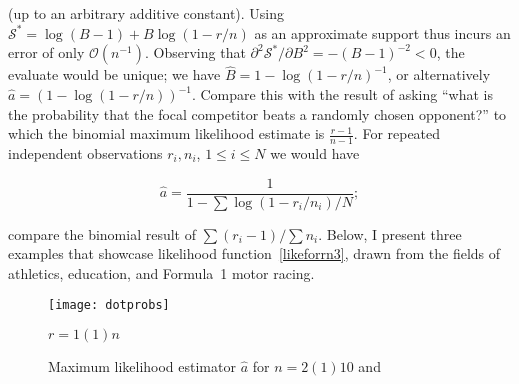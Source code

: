 \documentclass[article]{ajs}
\begin{document}
(up to an arbitrary additive constant).  Using
$\mathcal{S}^*=\log(B-1)+B\log(1-r/n)$ as an approximate support thus
incurs an error of only $\mathcal{O}(n^{-1})$.  Observing that
$\partial^2\mathcal{S}^*/\partial B^2=-(B-1)^{-2}<0$, the evaluate
would be unique; we have $\hat{B}=1-\log(1-r/n)^{-1}$, or
alternatively $\hat{a}=(1-\log(1-r/n))^{-1}$.  Compare this with the
result of asking ``what is the probability that the focal competitor
beats a randomly chosen opponent?'' to which the binomial maximum
likelihood estimate is $\frac{r-1}{n-1}$.  For repeated independent
observations $r_i,n_i$, $1\leqslant i\leqslant N$ we would have

\begin{equation}
  \hat{a} =   \frac{1}{1-\sum\log(1-r_i/n_i)/N};
\end{equation}

compare the binomial result of $\sum(r_i-1)/\sum n_i$.  Below, I
present three examples that showcase likelihood
function~\ref{likeforrn3}, drawn from the fields of athletics,
education, and Formula~1 motor racing.

\begin{figure}[t]
  \begin{centering}
\texttt{[image: dotprobs]}  %
\caption{Maximum likelihood estimator $\hat{a}$ for $n=2(1)10$
  and\label{dotprobs}} $r=1(1)n$
\end{centering}
\end{figure}

% 
% 
\end{document}
